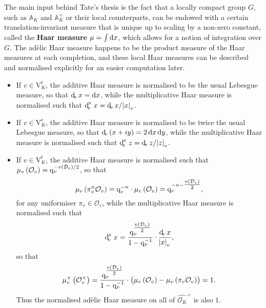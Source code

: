 \documentclass{article}
\newcommand{\1}{\mathbbm{1}}
\renewcommand{\AA}{\mathbb{A}}
\newcommand{\br}{\del}
\renewcommand{\c}{\mathrm{c}}
\newcommand{\DDD}{\mathcal{D}}
\newcommand{\f}{\mathrm{f}}
\newcommand{\OOO}{\mathcal{O}}
\newcommand{\q}{\mathrm{q}}
\renewcommand{\r}{\mathrm{r}}
\newcommand{\V}{\mathrm{V}}
\begin{document}
The main input behind Tate's thesis is the fact that a locally compact group $ G $, such as $ \AA_K $ and $ \AA_K^\times $ or their local counterparts, can be endowed with a certain translation-invariant measure that is unique up to scaling by a non-zero constant, called the \textbf{Haar measure} $ \mu = \int \dif x $, which allows for a notion of integration over $ G $. The ad\`elic Haar measure happens to be the product measure of the Haar measures at each completion, and these local Haar measures can be described and normalised explicitly for an easier computation later.
\begin{itemize}
\item If $ v \in \V_K^\r $, the additive Haar measure is normalised to be the usual Lebesgue measure, so that $ \dif_v x = \dif x $, while the multiplicative Haar measure is normalised such that $ \dif_v^\times x = \dif_v x / \abs{x}_v $.
\item If $ v \in \V_K^\c $, the additive Haar measure is normalised to be twice the usual Lebesgue measure, so that $ \dif_v \br{x + iy} = 2\dif x\dif y $, while the multiplicative Haar measure is normalised such that $ \dif_v^\times z = \dif_v z / \abs{z}_v $.
\item If $ v \in \V_K^\f $, the additive Haar measure is normalised such that $ \mu_v\br{\OOO_v} = \q_v^{-v\br{\DDD_v} / 2} $, so that
$$ \mu_v\br{\pi_v^n\OOO_v} = \q_v^{-n} \cdot \mu_v\br{\OOO_v} = \q_v^{-n - \tfrac{v\br{\DDD_v}}{2}}, $$
for any uniformiser $ \pi_v \in \OOO_v $, while the multiplicative Haar measure is normalised such that
$$ \dif_v^\times x = \dfrac{\q_v^{\tfrac{v\br{\DDD_v}}{2}}}{1 - \q_v^{-1}} \cdot \dfrac{\dif_v x}{\abs{x}_v}, $$
so that
$$ \mu_v^\times\br{\OOO_v^\times} = \dfrac{\q_v^{\tfrac{v\br{\DDD_v}}{2}}}{1 - \q_v^{-1}} \cdot \br{\mu_v\br{\OOO_v} - \mu_v\br{\pi_v\OOO_v}} = 1. $$
Thus the normalised ad\`elic Haar measure on all of $ \widehat{\OOO_K}^\times $ is also $ 1 $.
\end{itemize}
\end{document}
